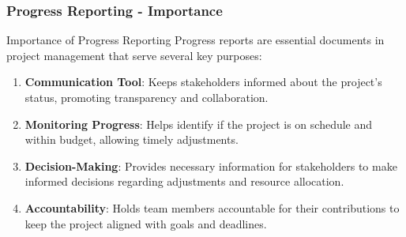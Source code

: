 \documentclass[aspectratio=169]{beamer}
\begin{document}
\begin{frame}[fragile]
  \frametitle{Progress Reporting - Importance}
  \begin{block}{Importance of Progress Reporting}
    Progress reports are essential documents in project management that serve several key purposes:
  \end{block}
  
  \begin{enumerate}
    \item \textbf{Communication Tool}: Keeps stakeholders informed about the project's status, promoting transparency and collaboration.
    \item \textbf{Monitoring Progress}: Helps identify if the project is on schedule and within budget, allowing timely adjustments.
    \item \textbf{Decision-Making}: Provides necessary information for stakeholders to make informed decisions regarding adjustments and resource allocation.
    \item \textbf{Accountability}: Holds team members accountable for their contributions to keep the project aligned with goals and deadlines.
  \end{enumerate}
\end{frame}
\end{document}
